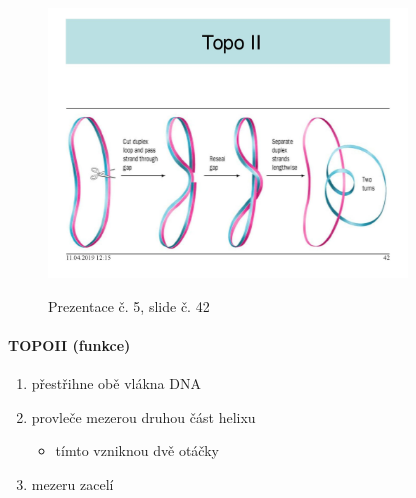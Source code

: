 \documentclass[DIV=8]{scrreprt}
\begin{document}
\begin{figure}
    \caption{Prezentace č. 5, slide č. 42}
    \includegraphics[width=0.85\textwidth]{slides-5/slide-42.jpg}
    \centering
    \label{slides-5-slide-42}
\end{figure}

\paragraph{TOPOII (funkce)}
\begin{enumerate}[nosep]
    \item přestřihne obě vlákna DNA
    \item provleče mezerou druhou část helixu
\begin{itemize}[nosep]
    \item tímto vzniknou dvě otáčky
\end{itemize}

    \item mezeru zacelí
\end{enumerate}
\end{document}
